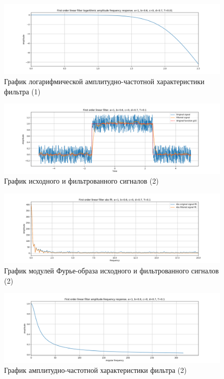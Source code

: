 \documentclass[a4paper, 12pt]{article}
\begin{document}
    \begin{figure}[H]
        \centering
        \includegraphics[scale=0.4]{1_lafr_filtered_linear.png}
        \captionsetup{skip=0pt}
        \caption{График логарифмической амплитудно-частотной характеристики фильтра (1)}
        \label{fig:filinlafr1}
    \end{figure}
    \begin{figure}[H]
        \centering
        \includegraphics[scale=0.4]{2_filtered_linear.png}
        \captionsetup{skip=0pt}
        \caption{График исходного и фильтрованного сигналов (2)}
        \label{fig:filin11}
    \end{figure}
    \begin{figure}[H]
        \centering
        \includegraphics[scale=0.4]{2_abs_filtered_linear.png}
        \captionsetup{skip=0pt}
        \caption{График модулей Фурье-образа исходного и фильтрованного сигналов (2)}
        \label{fig:filinabs11}
    \end{figure}
    \begin{figure}[H]
        \centering
        \includegraphics[scale=0.4]{2_afr_filtered_linear.png}
        \captionsetup{skip=0pt}
        \caption{График амплитудно-частотной характеристики фильтра (2)}
        \label{fig:filinafr11}
    \end{figure}
\end{document}
